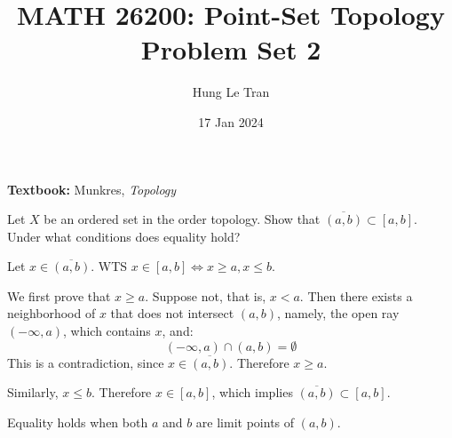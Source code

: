 \documentclass[a4paper, 12pt]{article}
\title{MATH 26200: Point-Set Topology \\ \large Problem Set 2}
\date{17 Jan 2024}
\author{Hung Le Tran}
\begin{document}
\maketitle
\setcounter{section}{2}
\textbf{Textbook:} Munkres, \textit{Topology}
\begin{problem} 
    Let $X$ be an ordered set in the order topology. Show that $\overline{(a, b)} \subset [a, b]$. Under what conditions does equality hold?
\end{problem}
\begin{solution}
    Let $x \in \overline{(a, b)}$. WTS $x \in [a, b] \Leftrightarrow x \geq a, x \leq b$.

    We first prove that $x \geq a$. Suppose not, that is, $x < a$. Then there exists a neighborhood of $x$ that does not intersect $(a, b)$, namely, the open ray $(-\infty, a)$, which contains $x$, and: \begin{equation*}
    (-\infty, a) \cap (a, b) = \emptyset
    \end{equation*}
    This is a contradiction, since $x \in \overline{(a, b)}$. Therefore $x \geq a$.

    Similarly, $x \leq b$. Therefore $x \in [a, b]$, which implies $\overline{(a, b)} \subset [a, b]$.

    Equality holds when both $a$ and $b$ are limit points of $(a, b)$.
\end{solution}
\end{document}
